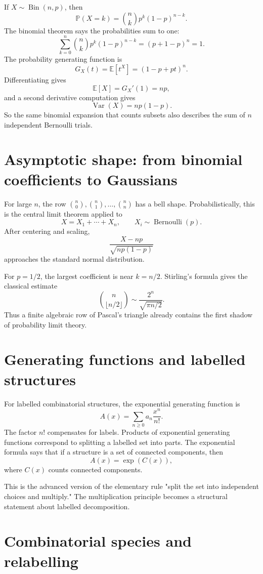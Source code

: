 If \(X\sim\operatorname{Bin}(n,p)\), then
\[
  \mathbb P(X=k)=\binom nkp^k(1-p)^{n-k}.
\]
The binomial theorem says the probabilities sum to one:
\[
  \sum_{k=0}^n\binom nkp^k(1-p)^{n-k}=(p+1-p)^n=1.
\]
The probability generating function is
\[
  G_X(t)=\mathbb E[t^X]=(1-p+pt)^n.
\]
Differentiating gives
\[
  \mathbb E[X]=G_X'(1)=np,
\]
and a second derivative computation gives
\[
  \operatorname{Var}(X)=np(1-p).
\]
So the same binomial expansion that counts subsets also describes the sum of \(n\) independent Bernoulli trials.

\section{Asymptotic shape: from binomial coefficients to Gaussians}

For large \(n\), the row \(\binom n0,\binom n1,\ldots,\binom nn\) has a bell shape.  Probabilistically, this is the central limit theorem applied to
\[
  X=X_1+\cdots+X_n,\qquad X_i\sim\operatorname{Bernoulli}(p).
\]
After centering and scaling,
\[
  \frac{X-np}{\sqrt{np(1-p)}}
\]
approaches the standard normal distribution.

For \(p=1/2\), the largest coefficient is near \(k=n/2\).  Stirling's formula gives the classical estimate
\[
  \binom n{\lfloor n/2\rfloor}
  \sim \frac{2^n}{\sqrt{\pi n/2}}.
\]
Thus a finite algebraic row of Pascal's triangle already contains the first shadow of probability limit theory.

\section{Generating functions and labelled structures}

For labelled combinatorial structures, the exponential generating function is
\[
  A(x)=\sum_{n\ge0}a_n\frac{x^n}{n!}.
\]
The factor \(n!\) compensates for labels.  Products of exponential generating functions correspond to splitting a labelled set into parts.  The exponential formula says that if a structure is a set of connected components, then
\[
  A(x)=\exp(C(x)),
\]
where \(C(x)\) counts connected components.

This is the advanced version of the elementary rule "split the set into independent choices and multiply."  The multiplication principle becomes a structural statement about labelled decomposition.

\section{Combinatorial species and relabelling}


